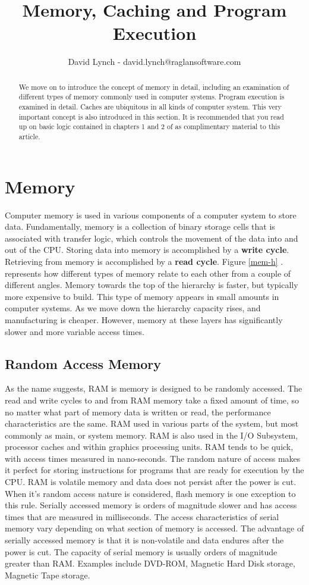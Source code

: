\documentclass[10pt,a4paper]{article}
\title{Memory, Caching and Program Execution}
\author{David Lynch - david.lynch@raglansoftware.com }
\begin{document}
\maketitle
\begin{abstract}
We move on to introduce the concept of memory in detail, including an examination of different types of memory commonly used in computer systems. Program execution is examined in detail. Caches are ubiquitous in all kinds of computer system. This very important concept is also introduced in this section. It is recommended that you read up on basic logic contained in chapters 1 and 2 of \cite{LOGICDESIGN} as complimentary material to this article. 
\end{abstract}

\section{Memory}
Computer memory is used in various components of a computer system to store data. Fundamentally, memory is a collection of binary storage cells that is associated with transfer logic, which controls the movement of the data into and out of the CPU. Storing data into memory is accomplished by a {\bf write cycle}. Retrieving from memory is accomplished by a {\bf read cycle}. Figure \ref{mem-h} . represents how different types of memory relate to each other from a couple of different angles. Memory towards the top of the hierarchy is faster, but typically more expensive to build. This type of memory appears in small amounts in computer systems. As we move down the hierarchy capacity rises, and manufacturing is cheaper. However, memory at these layers has significantly slower and more variable access times. 
\subsection{Random Access Memory}
As the name suggests, RAM is memory is designed to be randomly accessed. The read and write cycles to and from RAM memory take a fixed amount of time, so no matter what part of memory data is written or read, the performance characteristics are the same. RAM used in various parts of the system, but most commonly as main, or system memory. RAM is also used in the I/O Subsystem, processor caches and within graphics processing units. RAM tends to be quick, with access times measured in nano-seconds. The random nature of access makes it perfect for storing instructions for programs that are ready for execution by the CPU. RAM is volatile memory and data does not persist after the power is cut. When it's random access nature is considered, flash memory is one exception to this rule. 
\newline\newline
Serially accessed memory is orders of magnitude slower and has access times that are measured in milliseconds. The access characteristics of serial memory vary depending on what section of memory is accessed. The advantage of serially accessed memory is that it is non-volatile and data endures after the power is cut. The capacity of serial memory is usually orders of magnitude greater than RAM. Examples include DVD-ROM, Magnetic Hard Disk storage, Magnetic Tape storage. 
\end{document}
